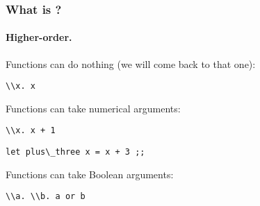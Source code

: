 \documentclass[12pt,red]{beamer}
\begin{document}
\begin{frame}
  \frametitle{What is \ML?}

  \framesubtitle{Higher-order.}

  Functions can do nothing (we will come back to that one):
  \vspace*{0.05in}
  \begin{beamerboxesrounded}[shadow=true]{}
    \begin{center}
      \lstinline{\\x. x}
    \end{center}
  \end{beamerboxesrounded}

  \vspace{0.3in}

  Functions can take numerical arguments:
  \vspace*{0.05in}
  \begin{beamerboxesrounded}[shadow=true]{}
    \begin{center}
      \lstinline{\\x. x + 1}
    \end{center}
  \end{beamerboxesrounded}
  \begin{beamerboxesrounded}[shadow=true]{}
    \begin{center}
      \lstinline{let plus\_three x = x + 3 ;;}
    \end{center}
  \end{beamerboxesrounded}

  \vspace{0.3in}

  Functions can take Boolean arguments:
  \vspace*{0.05in}
  \begin{beamerboxesrounded}[shadow=true]{}
    \begin{center}
      \lstinline{\\a. \\b. a or b}
    \end{center}
  \end{beamerboxesrounded}
\end{frame}
\end{document}
